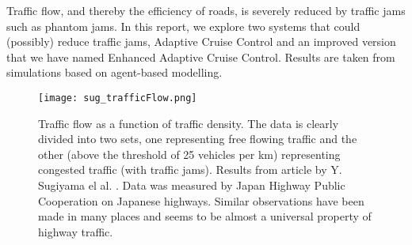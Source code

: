Traffic flow, and thereby the efficiency of roads, is severely reduced by
traffic jams such as phantom jams. In this report, we explore two systems that
could (possibly) reduce traffic jams, Adaptive Cruise Control and an improved
version that we have named Enhanced Adaptive Cruise Control. Results are taken
from simulations based on agent-based modelling.

\begin{figure}[H]
    \begin{center}
    \texttt{[image: sug\_trafficFlow.png]}
    \caption{\label{sug_flow}
Traffic flow as a function of traffic density. The data is clearly divided
into two sets, one representing free flowing traffic and the other (above the
threshold of 25 vehicles per km) representing congested traffic (with traffic
jams).  Results from article by Y. Sugiyama el al. \cite{sugiyama}.  Data was
measured by Japan Highway Public Cooperation on Japanese highways. Similar
observations have been made in many places and seems to be almost a universal
property of highway traffic.}
    \end{center}
\end{figure}

